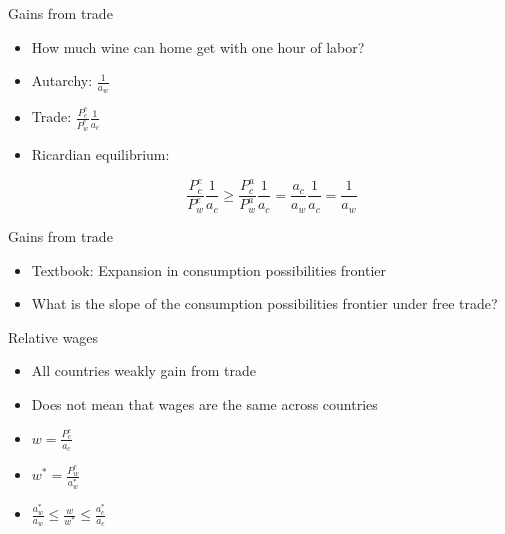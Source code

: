 \documentclass[ignorenonframetext,]{beamer}
\begin{document}
\begin{frame}{Gains from trade}

    \begin{itemize}
        \item How much wine can home get with one hour of labor?
        \item Autarchy: $\frac{1}{a_w} $
        \item Trade: $\frac{P^e_c}{P^e_w}\frac{1}{a_c}$
        \item Ricardian equilibrium: 

            \begin{equation*}
                \frac{P^e_c}{P^e_w}\frac{1}{a_c} \geq \frac{P^a_c}{P^a_w}\frac{1}{a_c} = \frac{a_c}{a_w}\frac{1}{a_c} = \frac{1}{a_w}
            \end{equation*}
    \end{itemize}

\end{frame}

\begin{frame}{Gains from trade}

    \begin{itemize}
        \item Textbook: Expansion in consumption possibilities frontier 
        \item What is the slope of the consumption possibilities frontier under free trade?
    \end{itemize}

\end{frame}

\begin{frame}{Relative wages}

    \begin{itemize}
        \item All countries weakly gain from trade
        \item Does not mean that wages are the same across countries 
    \end{itemize}

    \begin{itemize}
        \item $w = \frac{P^e_c}{a_c}$
        \item $w^* = \frac{P^e_w}{a_w^*}$
        \item $\frac{a_w^*}{a_w} \leq \frac{w}{w^*} \leq \frac{a_c^*}{a_c}$
    \end{itemize}

\end{frame}
\end{document}
